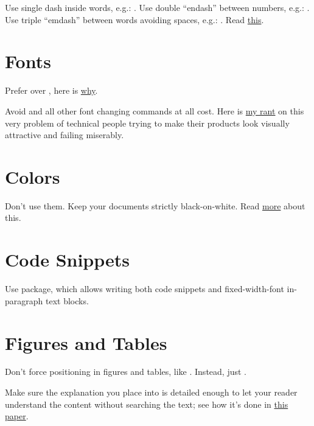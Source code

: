 \documentclass[12pt,nonacm,natbib=false]{acmart}
\begin{document}
Use single dash inside words, e.g.: .
Use double ``endash'' between numbers, e.g.: .
Use triple ``emdash'' between words avoiding spaces, e.g.: .
Read \href{https://tex.stackexchange.com/questions/3819/dashes-vs-vs}{this}.

\section{Fonts}

Prefer  over , here is \href{https://tex.stackexchange.com/a/1983/1449}{why}.

Avoid  and all other font changing commands at all cost. Here is \href{https://www.yegor256.com/2019/05/21/dont-improvise.html}{my rant} on this very problem of technical people trying to make their products look visually attractive and failing miserably.

\section{Colors}

Don't use them. Keep your documents strictly black-on-white. Read \href{https://academia.stackexchange.com/questions/13616/are-there-good-reasons-to-avoid-using-color-in-research-papers}{more} about this.

\section{Code Snippets}

Use \href{https://ctan.org/pkg/ffcode}{} package, which allows writing both code snippets and fixed-width-font in-paragraph text blocks.

\section{Figures and Tables}

Don't force positioning in figures and tables, like . Instead, just .

Make sure the explanation you place into  is detailed enough to let your reader understand the content without searching the text; see how it's done in \href{https://arxiv.org/abs/2203.07814}{this paper}.
\end{document}

